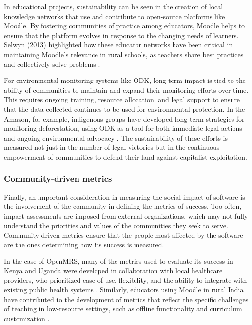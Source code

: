 \begin{refsection}
In educational projects, sustainability can be seen in the creation of local knowledge networks that use and contribute to open-source platforms like Moodle. By fostering communities of practice among educators, Moodle helps to ensure that the platform evolves in response to the changing needs of learners. Selwyn (2013) highlighted how these educator networks have been critical in maintaining Moodle’s relevance in rural schools, as teachers share best practices and collectively solve problems \cite[pp.~100-103]{selwyn2013}.

For environmental monitoring systems like ODK, long-term impact is tied to the ability of communities to maintain and expand their monitoring efforts over time. This requires ongoing training, resource allocation, and legal support to ensure that the data collected continues to be used for environmental protection. In the Amazon, for example, indigenous groups have developed long-term strategies for monitoring deforestation, using ODK as a tool for both immediate legal actions and ongoing environmental advocacy \cite[pp.~52-55]{cepek2012}. The sustainability of these efforts is measured not just in the number of legal victories but in the continuous empowerment of communities to defend their land against capitalist exploitation.

\subsubsection{Community-driven metrics}

Finally, an important consideration in measuring the social impact of software is the involvement of the community in defining the metrics of success. Too often, impact assessments are imposed from external organizations, which may not fully understand the priorities and values of the communities they seek to serve. Community-driven metrics ensure that the people most affected by the software are the ones determining how its success is measured.

In the case of OpenMRS, many of the metrics used to evaluate its success in Kenya and Uganda were developed in collaboration with local healthcare providers, who prioritized ease of use, flexibility, and the ability to integrate with existing public health systems \cite[pp.~261-263]{farmer2010}. Similarly, educators using Moodle in rural India have contributed to the development of metrics that reflect the specific challenges of teaching in low-resource settings, such as offline functionality and curriculum customization \cite[pp.~99-101]{selwyn2013}.


\end{refsection}

